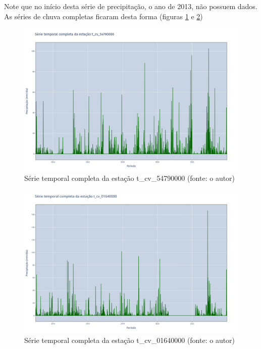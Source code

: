 Note que no início desta série de precipitação, o ano de 2013, não possuem dados. As séries de chuva completas ficaram desta forma (figuras \ref{fig:jequitinhonhaSerieCompleta_t_cv_54790000} e \ref{fig:jequitinhonhaSerieCompleta_t_cv_01640000})

\begin{figure}[!h]
\centering
\includegraphics[scale=0.25]{Figuras/jequiti/jequitinhonhaSerieCompleta_t_cv_54790000.png}
\caption{Série temporal completa da estação t\_cv\_54790000 (fonte: o autor)}
\label{fig:jequitinhonhaSerieCompleta_t_cv_54790000}
\end{figure}

\begin{figure}[!h]
\centering
\includegraphics[scale=0.25]{Figuras/jequiti/jequitinhonhaSerieCompleta_t_cv_01640000.png}
\caption{Série temporal completa da estação t\_cv\_01640000 (fonte: o autor)}
\label{fig:jequitinhonhaSerieCompleta_t_cv_01640000}
\end{figure}

